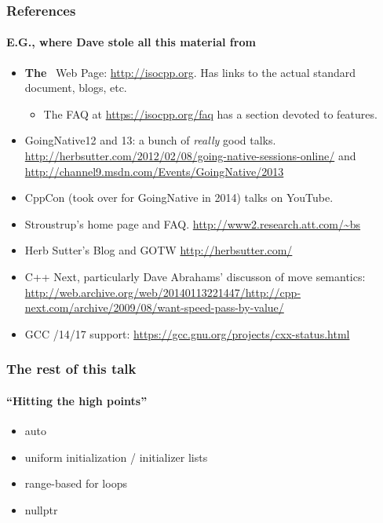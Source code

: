\lyxframeend{}%








\begin{frame}[fragile]
\frametitle{ References}
\framesubtitle{E.G., where Dave stole all this material from}

\begin{itemize}
\item {\bf The} \CC\ Web Page: {\url{http://isocpp.org}}.  Has links to the actual standard document, blogs, etc.
      \begin{itemize}
      \item The FAQ at {\footnotesize \url{https://isocpp.org/faq}} has a section devoted to  features.
      \end{itemize}
\item GoingNative12 and 13: a bunch of \emph{really} good
      talks. {\footnotesize \url{http://herbsutter.com/2012/02/08/going-native-sessions-online/}} and
      {\footnotesize \url{http://channel9.msdn.com/Events/GoingNative/2013}}
\item CppCon (took over for GoingNative in 2014) talks on YouTube.
\item Stroustrup's home page and FAQ. {\footnotesize \url{http://www2.research.att.com/~bs}}
\item Herb Sutter's Blog and GOTW {\footnotesize \url{http://herbsutter.com/}}
\item C++ Next, particularly Dave Abrahams' discusson of move
semantics: {\footnotesize \url{http://web.archive.org/web/20140113221447/http://cpp-next.com/archive/2009/08/want-speed-pass-by-value/}}


\item GCC /14/17 support: {\footnotesize \url{https://gcc.gnu.org/projects/cxx-status.html}}


\end{itemize}


\end{frame}



\begin{frame}[fragile]
\frametitle{The rest of this talk}
\framesubtitle{``Hitting the high points''}

\begin{itemize}

        \item auto
        \item uniform initialization / initializer lists
        \item range-based for loops
        \item nullptr
\end{itemize}

\end{frame}
